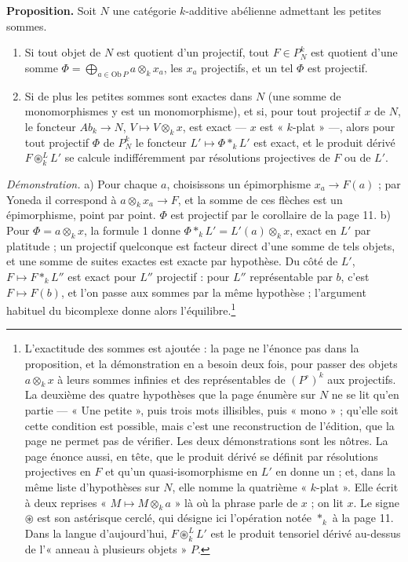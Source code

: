 \documentclass[11pt,a4paper]{article}
\begin{document}
\textbf{Proposition.} Soit $N$ une catégorie $k$-additive abélienne admettant
les petites sommes.
\begin{enumerate}
\item[a)] Si tout objet de $N$ est quotient d'un projectif, tout $F \in
P^{k}_{N}$ est quotient d'une somme
$\Phi = \bigoplus_{a \in \mathrm{Ob}\, P} a \otimes_{k} x_{a}$, les $x_{a}$
projectifs, et un tel $\Phi$ est projectif.
\item[b)] Si de plus les petites sommes sont exactes dans $N$ (une somme de
monomorphismes y est un monomorphisme), et si, pour tout projectif $x$ de $N$,
le foncteur $Ab_{k} \to N$, $V \mapsto V \otimes_{k} x$, est exact --- $x$
est « $k$-plat » ---, alors pour tout projectif $\Phi$ de $P^{k}_{N}$ le foncteur
$L' \mapsto \Phi *_{k} L'$ est exact, et le produit dérivé
$F \circledast^{L}_{k} L'$ se calcule indifféremment par résolutions
projectives de $F$ ou de $L'$.
\end{enumerate}

\emph{Démonstration.} a) Pour chaque $a$, choisissons un épimorphisme
$x_{a} \to F(a)$ ; par Yoneda il correspond à $a \otimes_{k} x_{a} \to F$, et la
somme de ces flèches est un épimorphisme, point par point. $\Phi$ est
projectif par le corollaire de la page 11. b) Pour $\Phi = a \otimes_{k} x$,
la formule 1 donne $\Phi *_{k} L' = L'(a) \otimes_{k} x$, exact en $L'$ par
platitude ; un projectif quelconque est facteur direct d'une somme de tels
objets, et une somme de suites exactes est exacte par hypothèse. Du côté de
$L'$, $F \mapsto F *_{k} L''$ est exact pour $L''$ projectif : pour $L''$
représentable par $b$, c'est $F \mapsto F(b)$, et l'on passe aux sommes par la
même hypothèse ; l'argument habituel du bicomplexe donne alors
l'équilibre.\footnote{L'exactitude des sommes est ajoutée : la page ne l'énonce
pas dans la proposition, et la démonstration en a besoin deux fois, pour
passer des objets $a \otimes_{k} x$ à leurs sommes infinies et des
représentables de $(P^{\circ})^{k}$ aux projectifs. La deuxième des quatre
hypothèses que la page énumère sur $N$ ne se lit qu'en partie --- « Une
petite », puis trois mots illisibles, puis « mono » ; qu'elle soit cette condition est possible, mais c'est une
reconstruction de l'édition, que la page ne permet pas de vérifier. Les deux
démonstrations sont les nôtres. La page énonce
aussi, en tête, que le produit dérivé se définit par résolutions projectives en
$F$ et qu'un quasi-isomorphisme en $L'$ en donne un ; et, dans la même liste
d'hypothèses sur $N$, elle nomme la quatrième « $k$-plat ». Elle écrit à deux reprises « $M \mapsto M \otimes_{k} a$ »
là où la phrase parle de $x$ ; on lit $x$. Le signe $\circledast$ est son
astérisque cerclé, qui désigne ici l'opération notée $*_{k}$ à la page 11.
Dans la langue d'aujourd'hui, $F \circledast^{L}_{k} L'$ est le produit
tensoriel dérivé au-dessus de l'« anneau à plusieurs objets » $P$.}
\end{document}
